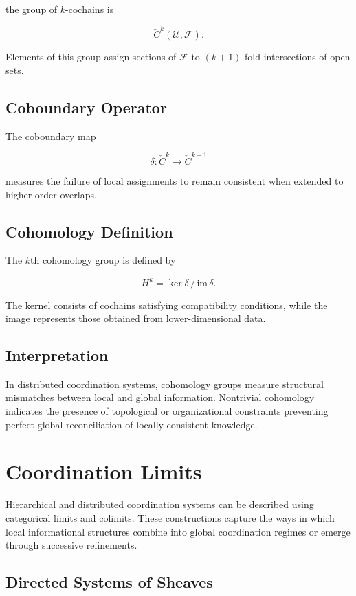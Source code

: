 \documentclass[12pt]{article}
\begin{document}
the group of $k$-cochains is

\[
\check{C}^k(\mathcal{U},\mathcal{F}).
\]

Elements of this group assign sections of $\mathcal{F}$ to $(k+1)$-fold intersections of open sets.

\subsection{Coboundary Operator}

The coboundary map

\[
\delta : \check{C}^k \rightarrow \check{C}^{k+1}
\]

measures the failure of local assignments to remain consistent when extended to higher-order overlaps.

\subsection{Cohomology Definition}

The $k$th cohomology group is defined by

\[
H^k = \ker \delta \, / \, \mathrm{im}\,\delta.
\]

The kernel consists of cochains satisfying compatibility conditions, while the image represents those obtained from lower-dimensional data.

\subsection{Interpretation}

In distributed coordination systems, cohomology groups measure structural mismatches between local and global information. Nontrivial cohomology indicates the presence of topological or organizational constraints preventing perfect global reconciliation of locally consistent knowledge.

\section{Coordination Limits}

Hierarchical and distributed coordination systems can be described using categorical limits and colimits. These constructions capture the ways in which local informational structures combine into global coordination regimes or emerge through successive refinements.

\subsection{Directed Systems of Sheaves}
\end{document}
